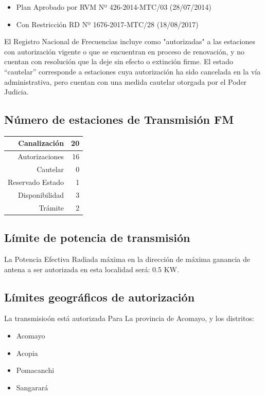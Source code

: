 \documentclass[11pt]{article}
\begin{document}
\begin{itemize}
	\item Plan Aprobado por RVM Nº 426-2014-MTC/03 (28/07/2014)
	\item Con Restricción RD Nº 1676-2017-MTC/28 (18/08/2017)
\end{itemize}

El Registro Nacional de Frecuencias incluye como "autorizadas" a las estaciones con autorización vigente o que se encuentran en proceso de renovación, y no cuentan con resolución que la deje sin efecto o extinción firme. El estado “cautelar” corresponde a estaciones cuya autorización ha sido cancelada en la vía administrativa, pero cuentan con una medida cautelar otorgada por el Poder Judicia.

\subsection{Número de estaciones de Transmisión FM}

\begin{tabular}{|r|r|} \hline
	Canalización 			& 20 \\ \hline
	Autorizaciones			& 16 \\ \hline
	Cautelar				& 0 \\ \hline
	Reservado Estado		& 1 \\ \hline
	Disponibilidad			& 3 \\ \hline
	Trámite					& 2 \\ \hline 
\end{tabular}

\subsection{Límite de potencia de transmisión}

La Potencia Efectiva Radiada máxima en la dirección de máxima ganancia de antena a ser autorizada en esta localidad será: 0.5 KW.
	
\subsection{Límites geográficos de autorización}

La transmisioón está autorizada Para La provincia de Acomayo, y los distritos:

\begin{itemize}
	\item Acomayo 
	\item Acopia 
	\item Pomacanchi 
	\item Sangarará
\end{itemize}
	
\end{document}
